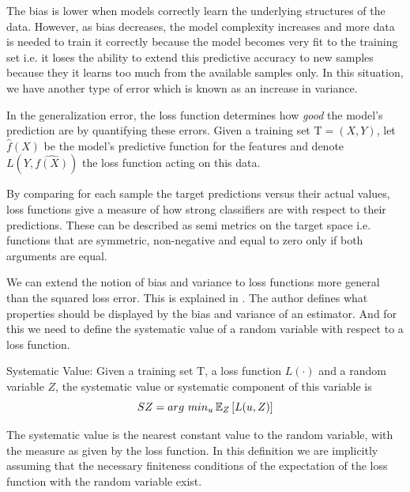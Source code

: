 The bias is lower when models correctly learn the underlying structures of the data. However, as bias decreases, the model complexity increases and more data is needed to train it correctly because the model becomes very fit to the training set i.e. it loses the ability to extend this predictive accuracy to new samples because they it learns too much from the available samples only. In this situation, we have another type of error which is known as an increase in variance.

In the generalization error, the loss function determines how \textit{good} the model's prediction are by quantifying these errors. Given a training set $\mathrm{T} = (X,Y)$, let $\hat{f}(X)$ be the model's predictive function for the features and denote $L( Y,\hat{f(X)} )$ the loss function acting on this data.

By comparing for each sample the target predictions versus their actual values, loss functions give a measure of how strong classifiers are with respect to their predictions. These can be described as semi metrics on the target space i.e. functions that are symmetric, non-negative and equal to zero only if both arguments are equal.


We can extend the notion of bias and variance to loss functions more general than the squared loss error. This is explained in \textcite{james-biasVarianceGeneral}. The author defines what properties should be displayed by the bias and variance of an estimator. And for this we need to define the systematic value of a random variable with respect to a loss function.


\begin{definition}{Systematic Value:}
Given a training set $\mathrm{T}$, a loss function $L(\cdot)$ and a random variable $Z$, the systematic value or systematic component of this variable is
$$ SZ = arg \ min_u \operatorname{\mathbb{E}}_{Z} \left[ L(u,Z) \right]$$
\end{definition}

The systematic value is the nearest constant value to the random variable, with the measure as given by the loss function. In this definition we are implicitly assuming that the necessary finiteness conditions of the expectation of the loss function with the random variable exist. 


